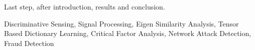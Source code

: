 Last step, after introduction, results and conclusion.

\begin{keywords}
Discriminative Sensing, Signal Processing, Eigen Similarity Analysis, Tensor Based Dictionary Learning, Critical Factor Analysis, Network Attack Detection, Fraud Detection
\end{keywords}